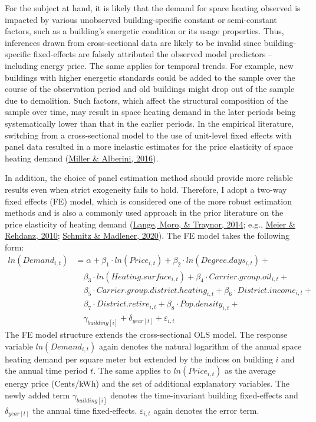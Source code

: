 \documentclass[12pt,twoside]{reedthesis}
\begin{document}
For the subject at hand, it is likely that the demand for space heating observed is impacted by various unobserved building-specific constant or semi-constant factors, such as a building's energetic condition or its usage properties. Thus, inferences drawn from cross-sectional data are likely to be invalid since building-specific fixed-effects are falsely attributed the observed model predictors -- including energy price. The same applies for temporal trends. For example, new buildings with higher energetic standards could be added to the sample over the course of the observation period and old buildings might drop out of the sample due to demolition. Such factors, which affect the structural composition of the sample over time, may result in space heating demand in the later periods being systematically lower than that in the earlier periods. In the empirical literature, switching from a cross-sectional model to the use of unit-level fixed effects with panel data resulted in a more inelastic estimates for the price elasticity of space heating demand (\protect\hyperlink{ref-miller_alberini16}{Miller \& Alberini, 2016}).

In addition, the choice of panel estimation method should provide more reliable results even when strict exogeneity fails to hold. Therefore, I adopt a two-way fixed effects (FE) model, which is considered one of the more robust estimation methods and is also a commonly used approach in the prior literature on the price elasticity of heating demand (\protect\hyperlink{ref-lange_etal14}{Lange, Moro, \& Traynor, 2014}; e.g., \protect\hyperlink{ref-meier_rehdanz10}{Meier \& Rehdanz, 2010}; \protect\hyperlink{ref-schmitz_madlener20}{Schmitz \& Madlener, 2020}). The FE model takes the following form:
\begin{align*}
ln(Demand_{i,t}) & = \alpha + \beta_1 \cdot ln(Price_{i,t}) + \beta_2 \cdot ln(Degree.days_{i,t}) + \\
 & \quad \beta_3 \cdot ln(Heating.surface_{i,t}) + \beta_{4} \cdot Carrier.group.oil_{i,t} + \\
 & \quad \beta_{5} \cdot Carrier.group.district.heating_{i,t} + \beta_{6} \cdot District.income_{i,t} + \\
 & \quad \beta_{7} \cdot District.retire_{i,t} + \beta_{8} \cdot Pop.density_{i,t} + \\
 & \quad \gamma_{building[i]} + \delta_{year[t]} + \varepsilon_{i,t}
\end{align*}
The FE model structure extends the cross-sectional OLS model. The response variable \(ln(Demand_{i,t})\) again denotes the natural logarithm of the annual space heating demand per square meter but extended by the indices on building \(i\) and the annual time period \(t\). The same applies to \(ln(Price_{i,t})\) as the average energy price (Cents/kWh) and the set of additional explanatory variables. The newly added term \(\gamma_{building[i]}\) denotes the time-invariant building fixed-effects and \(\delta_{year[t]}\) the annual time fixed-effects. \(\varepsilon_{i,t}\) again denotes the error term.
\end{document}
